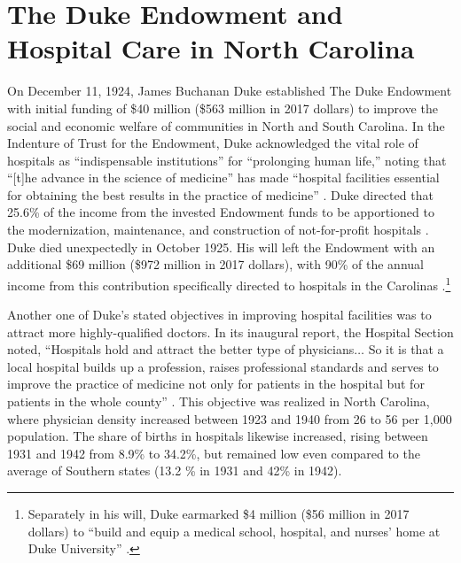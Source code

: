 \documentclass[12pt]{article}
\begin{document}

\section{The Duke Endowment and Hospital Care in North Carolina} \label{sec:Duke}

On December 11, 1924, James Buchanan Duke established The Duke Endowment with initial funding of \$40 million (\$563 million in 2017 dollars) to improve the social and economic welfare of communities in North and South Carolina.
In the Indenture of Trust for the Endowment, Duke acknowledged the vital role of hospitals as ``indispensable institutions'' for ``prolonging human life,'' noting that ``[t]he advance in the science of medicine'' has made ``hospital facilities essential for obtaining the best results in the practice of medicine'' .
Duke directed that 25.6\% of the income from the invested Endowment funds to be apportioned to the modernization, maintenance, and construction of not-for-profit hospitals .
Duke died unexpectedly in October 1925. His will left the Endowment with an additional \$69 million (\$972 million in 2017 dollars), with 90\% of the annual income from this contribution specifically directed to hospitals in the Carolinas .\footnote{Separately in his will, Duke earmarked \$4 million (\$56 million in 2017 dollars) to ``build and equip a medical school, hospital, and nurses' home at Duke University'' .} 

Another one of Duke's stated objectives in improving hospital facilities was to attract more highly-qualified doctors. In its inaugural report, the Hospital Section noted, ``Hospitals hold and attract the better type of physicians$\ldots$ So it is that a local hospital builds up a profession, raises professional standards and serves to improve the practice of medicine not only for patients in the hospital but for patients in the whole county'' . This objective was realized in North Carolina, where physician density increased between 1923 and 1940 from 26 to 56 per 1,000 population.
The share of births in hospitals likewise increased, rising between 1931 and 1942 from 8.9\% to 34.2\%, but remained low even compared to the average of Southern states (13.2 \% in 1931 and 42\% in 1942).
\end{document}
